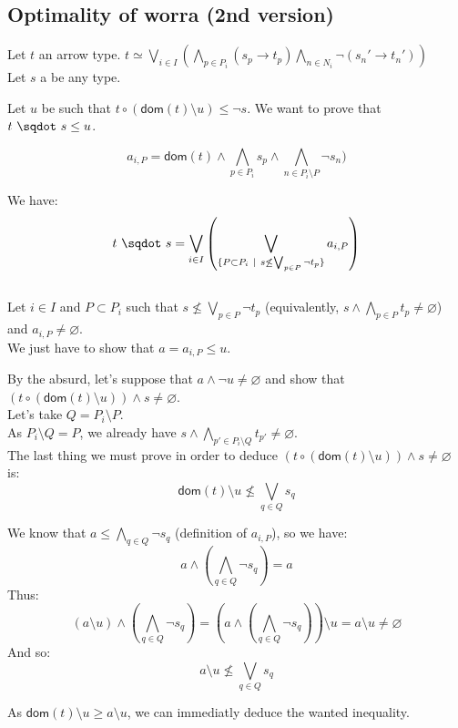 \documentclass[a4paper]{article}%
\newcommand{\worra}[2]{#1\mathop{\,\sqdot\,} #2}
\newcommand{\apply}[2]{#1\circ#2}
\newcommand{\dom}[1]{\textsf{dom}(#1)}
\newcommand{\alt}{~|~}
\begin{document}
    \pagebreak

    \subsection{Optimality of worra (2nd version)}

    Let $t$ an arrow type. $t \simeq \bigvee_{i\in I}\left(\bigwedge_{p\in P_i}(s_p\to t_p)\bigwedge_{n\in N_i}\neg(s_n'\to t_n')\right)$\\
    Let $s$ a be any type.

    Let $u$ be such that $\apply t {(\dom t \setminus u)} \leq \neg s$. We want to prove that $\worra t s \leq u$.

    \[a_{i,P}=\dom t \land \bigwedge_{p\in P_i} s_p \land \bigwedge_{n \in P_i \setminus P} \neg s_n)\]

    We have:
    \[\worra t s = \bigvee_{i \in I} \left(\bigvee_{\{P \subset P_i\alt s \not\leq \bigvee_{p \in P} \neg t_p \} } a_{i,P}\right) \]\\

    Let $i \in I$ and $P \subset P_i$ such that $s \not\leq \bigvee_{p \in P} \neg t_p$ (equivalently, $s \land \bigwedge_{p \in P} t_p \neq \varnothing$) and $a_{i,P} \neq \varnothing$.\\
    We just have to show that $a = a_{i,P} \leq u$.

    By the absurd, let's suppose that $a \land \neg u \neq \varnothing$ and show that $(\apply t {(\dom t \setminus u)}) \land s \neq \varnothing$.\\

    Let's take $Q = P_i \setminus P$.\\

    As $P_i \setminus Q = P$, we already have $s \land \bigwedge_{p'\in P_i\setminus Q}t_{p'} \neq \varnothing$.\\
    The last thing we must prove in order to deduce $(\apply t {(\dom t \setminus u)}) \land s \neq \varnothing$ is:\\
    \[ \dom t \setminus u \not\leq \bigvee_{q\in Q}s_q \]

    We know that $a \leq \bigwedge_{q \in Q} \neg s_q$ (definition of $a_{i,P}$), so we have:
    \[a \land (\bigwedge_{q\in Q} \neg s_q) = a\]
    Thus: \[(a \setminus u) \land (\bigwedge_{q\in Q} \neg s_q) = (a \land (\bigwedge_{q\in Q} \neg s_q)) \setminus u = a \setminus u \neq \varnothing\]
    And so: \[ a \setminus u \not\leq \bigvee_{q\in Q}s_q \]

    As $ \dom t \setminus u \geq a \setminus u$, we can immediatly deduce the wanted inequality.
\end{document}
